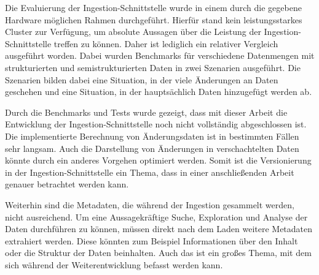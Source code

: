 Die Evaluierung der Ingestion-Schnittstelle wurde in einem durch die gegebene Hardware möglichen Rahmen durchgeführt.
Hierfür stand kein leistungsstarkes Cluster zur Verfügung, um absolute Aussagen über die Leistung der Ingestion-Schnittstelle treffen zu können.
Daher ist lediglich ein relativer Vergleich ausgeführt worden.
Dabei wurden Benchmarks für verschiedene Datenmengen mit strukturierten und semistrukturierten Daten in zwei Szenarien ausgeführt.
Die Szenarien bilden dabei eine Situation, in der viele Änderungen an Daten geschehen und eine Situation, in der hauptsächlich Daten hinzugefügt werden ab.

Durch die Benchmarks und Tests wurde gezeigt, dass mit dieser Arbeit die Entwicklung der Ingestion-Schnittstelle noch nicht vollständig abgeschlossen ist.
Die implementierte Berechnung von Änderungsdaten ist in bestimmten Fällen sehr langsam.
Auch die Darstellung von Änderungen in verschachtelten Daten könnte durch ein anderes Vorgehen optimiert werden.
Somit ist die Versionierung in der Ingestion-Schnittstelle ein Thema, dass in einer anschließenden Arbeit genauer betrachtet werden kann.

Weiterhin sind die Metadaten, die während der Ingestion gesammelt werden, nicht ausreichend.
Um eine Aussagekräftige Suche, Exploration und Analyse der Daten durchführen zu können, müssen direkt nach dem Laden weitere Metadaten extrahiert werden.
Diese könnten zum Beispiel Informationen über den Inhalt oder die Struktur der Daten beinhalten.
Auch das ist ein großes Thema, mit dem sich während der Weiterentwicklung befasst werden kann.